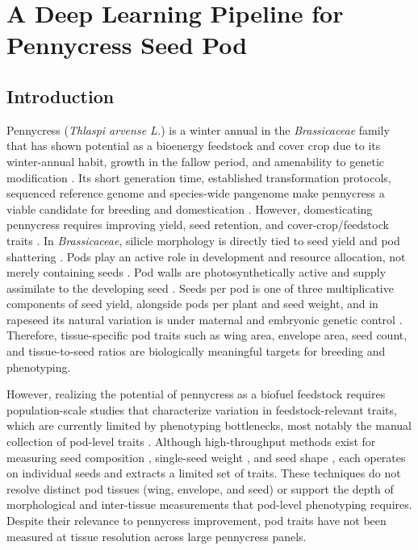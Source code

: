 \chapter{A Deep Learning Pipeline for Pennycress Seed Pod}\label{ch2:pennycress}
\section{Introduction}\label{sec:ch2-pc-background}
Pennycress (\textit{Thlaspi arvense L.}) is a winter annual in the \textit{Brassicaceae} family that has shown potential as a bioenergy feedstock and cover crop due to its winter-annual habit, growth in the fallow period, and amenability to genetic modification \cite{moser2009production,sedbrook2014new}. Its short generation time, established transformation protocols, sequenced reference genome \cite{nunn2022genome} and species-wide pangenome \cite{bird2026pangenome} make pennycress a viable candidate for breeding and domestication \cite{sedbrook2014new}. However, domesticating pennycress requires improving yield, seed retention, and cover-crop/feedstock traits \cite{sedbrook2014new}. In \textit{Brassicaceae}, silicle morphology is directly tied to seed yield and pod shattering \cite{nichol2025shock}. Pods play an active role in development and resource allocation, not merely containing seeds \cite{wing-seed-assoc}. Pod walls are photosynthetically active and supply assimilate to the developing seed \cite{hua2012silique,zhu2018silique}. Seeds per pod is one of three multiplicative components of seed yield, alongside pods per plant and seed weight, and in rapeseed its natural variation is under maternal and embryonic genetic control \cite{zhu2020seednumber}. Therefore, tissue-specific pod traits such as wing area, envelope area, seed count, and tissue-to-seed ratios are biologically meaningful targets for breeding and phenotyping.

However, realizing the potential of pennycress as a biofuel feedstock requires population-scale studies that characterize variation in feedstock-relevant traits, which are currently limited by phenotyping bottlenecks, most notably the manual collection of pod-level traits \cite{li2014review,seed-cnn}. Although high-throughput methods exist for measuring seed composition \cite{tuite2025nirs}, single-seed weight \cite{clohessy2018singleseed}, and seed shape \cite{tanabata2012smartgrain}, each operates on individual seeds and extracts a limited set of traits. These techniques do not resolve distinct pod tissues (wing, envelope, and seed) or support the depth of morphological and inter-tissue measurements that pod-level phenotyping requires. Despite their relevance to pennycress improvement, pod traits have not been measured at tissue resolution across large pennycress panels.

